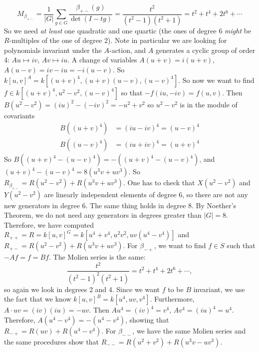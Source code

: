 \begin{ex}
	\[
	M_{\beta_{+-}}= \dfrac{1}{|G|} \sum_{g \in G} \dfrac{\beta_{+-}(g)}{\det(I-tg)}= \dfrac{t^2}{(t^2-1)(t^2+1)}= t^2 + t^4 + 2t^6 + \cdots
	\]
So we need \emph{at least} one quadratic and one quartic (the ones of degree 6 \emph{might} be $R$-multiples of the one of degree 2). Note in particular we are looking for polynomials invariant under the $A$-action, and $A$ generates a cyclic group of order 4: $Au \mapsto iv$, $Av \mapsto iu$. A change of variables $A(u+v)= i(u+v)$, $A(u-v)= iv - iu= -i(u-v)$. So $k[u,v]^A= k[(u+v)^4, (u+v)(u-v), (u-v)^4]$. So now we want to find $f \in k[(u+v)^4, u^2-v^2,(u-v)^4]$ so that $-f(iu,-iv)= f(u,v)$. Then $B(u^2-v^2)= (iu)^2 - (-iv)^2= -u^2 + v^2$ so $u^2-v^2$ is in the module of covariants
	\[
	\begin{split}
	B((u+v)^4)&= (iu-iv)^4= (u-v)^4 \\
	B((u-v)^4)&= (iu+iv)^4= (u+v)^4
	\end{split}
	\]
So $B((u+v)^4-(u-v)^4)= -((u+v)^4-(u-v)^4)$, and $(u+v)^4-(u-v)^4= 8(u^3v+uv^3)$. So $R_{\beta_{+-}}= R(u^2-v^2) + R(u^3v+uv^3)$. One has to check that $X(u^2-v^2)$ and $Y(u^2-v^2)$ are linearly independent elements of degree 6, so there are not any new generators in degree 6. The same thing holds in degree 8. By Noether's Theorem, we do not need any generators in degrees greater than $|G|= 8$. Therefore, we have computed $R_{++}= R= k[u,v]^G= k[u^4+v^4, u^2v^2, uv(u^4-v^4)]$ and $R_{+-}= R(u^2-v^2)+R(u^3v+uv^3)$. For $\beta_{-+}$, we want to find $f \in S$ such that $-Af= f= Bf$. The Molien series is the same:
	\[
	\dfrac{t^2}{(t^2-1)^2(t^2+1)}= t^2 + t^4 + 2t^6 + \cdots,
	\]
so again we look in degrees 2 and 4. Since we want $f$ to be $B$ invariant, we use the fact that we know $k[u,v]^B= k[u^4,uv,v^4]$. Furthermore, $A\cdot uv= (iv)(iu)= -uv$. Then $Au^4= (iv)^4= v^4$, $Av^4= (iu)^4= u^4$. Therefore, $A(u^4-v^4)= -(u^4-v^4)$, showing that $R_{-+}= R(uv) + R(u^4-v^4)$. For $\beta_{--}$, we have the same Molien series and the same procedures show that $R_{--}= R(u^2+v^2) + R(u^3v-uv^3)$. 


\end{ex}
